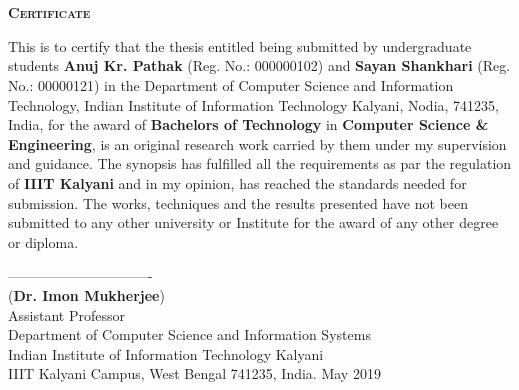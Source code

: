 \newpage
\chapter*{}
\begin{center}
\textbf{\textsc{\Large Certificate}}\\[0.75cm]
\end{center}

\onehalfspacing This is to certify that the thesis entitled
\textbf{} being submitted by undergraduate students \textbf{Anuj Kr. Pathak} (Reg. No.: 000000102) and \textbf{Sayan Shankhari} (Reg. No.: 00000121) in the Department of Computer Science and Information Technology, Indian Institute of Information Technology Kalyani, Nodia, 741235, India, for the award of \textbf{Bachelors of Technology} in \textbf{Computer Science \& Engineering}, is an original research work carried by them under my supervision and guidance. The synopsis has fulfilled all the requirements as par the regulation of \textbf{IIIT Kalyani} and in my opinion, has reached the standards needed for submission. The works, techniques and the results presented have not been submitted to any other university or Institute for the award of any other degree or diploma.\\
\bigskip
\bigskip
\bigskip
\bigskip
\bigskip
\bigskip
\bigskip
\begin{flushleft}
\bigskip
-------------------------------\\
(\textbf{Dr. Imon Mukherjee})\\
\smallskip
Assistant Professor\\
Department of Computer Science and Information Systems\\
Indian Institute of Information Technology Kalyani\\
IIIT Kalyani Campus, West Bengal 741235, India.
May 2019\\
\end{flushleft}
